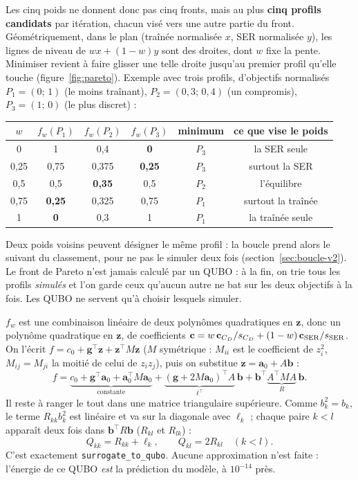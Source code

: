 Les cinq poids ne donnent donc pas cinq fronts, mais au plus \textbf{cinq profils candidats} par itération, chacun visé vers une autre partie du front. Géométriquement, dans le plan (traînée normalisée $x$, SER normalisée $y$), les lignes de niveau de $wx+(1-w)y$ sont des droites, dont $w$ fixe la pente. Minimiser revient à faire glisser une telle droite jusqu'au premier profil qu'elle touche (figure~\ref{fig:pareto}). Exemple avec trois profils, d'objectifs normalisés $P_1=(0;\,1)$ (le moins traînant), $P_2=(0{,}3;\,0{,}4)$ (un compromis), $P_3=(1;\,0)$ (le plus discret) :
\begin{center}
\renewcommand{\arraystretch}{1.2}
\small
\begin{tabular}{cccccc}
\toprule
$w$ & $f_w(P_1)$ & $f_w(P_2)$ & $f_w(P_3)$ & minimum & ce que vise le poids \\
\midrule
0 & 1 & 0,4 & \textbf{0} & $P_3$ & la SER seule \\
0,25 & 0,75 & 0,375 & \textbf{0,25} & $P_3$ & surtout la SER \\
0,5 & 0,5 & \textbf{0,35} & 0,5 & $P_2$ & l'équilibre \\
0,75 & \textbf{0,25} & 0,325 & 0,75 & $P_1$ & surtout la traînée \\
1 & \textbf{0} & 0,3 & 1 & $P_1$ & la traînée seule \\
\bottomrule
\end{tabular}
\end{center}
Deux poids voisins peuvent désigner le même profil : la boucle prend alors le suivant du classement, pour ne pas le simuler deux fois (section~\ref{sec:boucle-v2}). Le front de Pareto n'est jamais calculé par un QUBO : à la fin, on trie tous les profils \emph{simulés} et l'on garde ceux qu'aucun autre ne bat sur les deux objectifs à la fois. Les QUBO ne servent qu'à choisir lesquels simuler.

$f_w$ est une combinaison linéaire de deux polynômes quadratiques en $\mathbf z$, donc un polynôme quadratique en $\mathbf z$, de coefficients $\mathbf c=w\,\mathbf c_{C_D}/s_{C_D}+(1-w)\,\mathbf c_{\rm SER}/s_{\rm SER}$. On l'écrit $f=c_0+\mathbf g^\top\mathbf z+\mathbf z^\top M\mathbf z$ ($M$ symétrique : $M_{ii}$ est le coefficient de $z_i^2$, $M_{ij}=M_{ji}$ la moitié de celui de $z_iz_j$), puis on substitue $\mathbf z=\mathbf a_0+A\mathbf b$ :
\[ f=\underbrace{c_0+\mathbf g^\top\mathbf a_0+\mathbf a_0^\top M\mathbf a_0}_{\text{constante}}+\underbrace{(\mathbf g+2M\mathbf a_0)^\top A}_{\boldsymbol\ell^\top}\,\mathbf b+\mathbf b^\top\underbrace{A^\top MA}_{R}\,\mathbf b. \]
Il reste à ranger le tout dans une matrice triangulaire supérieure. Comme $b_k^2=b_k$, le terme $R_{kk}b_k^2$ est linéaire et va sur la diagonale avec $\ell_k$ ; chaque paire $k<l$ apparaît deux fois dans $\mathbf b^\top R\mathbf b$ ($R_{kl}$ et $R_{lk}$) :
\[ Q_{kk}=R_{kk}+\ell_k,\qquad Q_{kl}=2R_{kl}\quad(k<l). \]
C'est exactement \texttt{surrogate\_to\_qubo}. Aucune approximation n'est faite : l'énergie de ce QUBO \emph{est} la prédiction du modèle, à $10^{-14}$ près.

